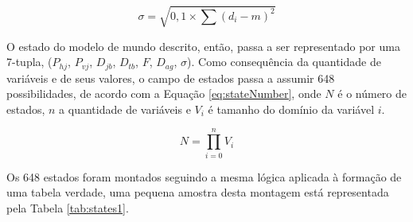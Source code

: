\begin{equation}
    \sigma=\sqrt{0,1\times \sum{(d_i - m)^2}}
    \label{eq:desvio}
\end{equation}

O estado do modelo de mundo descrito, então, passa a ser representado por uma 7-tupla,
($P_{hj}$, $P_{vj}$, $D_{jb}$, $D_{tb}$, $F$, $D_{ag}$, $\sigma$). Como
consequência da quantidade de variáveis e de seus valores, o campo de estados
passa a assumir 648 possibilidades, de acordo com a Equação
\ref{eq:stateNumber}, onde $N$ é o número de estados, $n$ a quantidade de
variáveis e $V_i$ é tamanho do domínio da variável $i$.

\begin{equation}\label{eq:stateNumber}
    N=\prod\limits_{i=0}^{n}{V_i}
\end{equation}

Os 648 estados foram montados seguindo a mesma lógica aplicada à formação de uma
tabela verdade, uma pequena amostra desta montagem está representada pela Tabela
\ref{tab:states1}.


